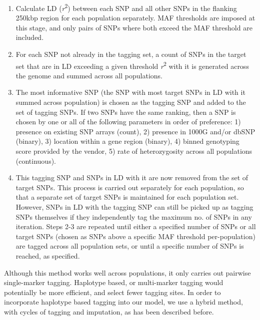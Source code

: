\begin{enumerate}
\item Calculate \gls{LD} (\textit{r}\textsuperscript{2}) between each \gls{SNP} and all other \glspl{SNP} in the flanking 250kbp region for each population separately. \gls{MAF} thresholds are imposed at this stage, and only pairs of \glspl{SNP} where both exceed the \gls{MAF} threshold are included.
\item For each \gls{SNP} not already in the tagging set, a count of \glspl{SNP} in the target set that are in \gls{LD} exceeding a given threshold \textit{r}\textsuperscript{2} with it is generated across the genome and summed across all populations.
\item The most informative \gls{SNP} (the \gls{SNP} with most target \glspl{SNP} in \gls{LD} with it summed across population) is chosen as the tagging \gls{SNP} and added to the set of tagging \glspl{SNP}. If two \glspl{SNP} have the same ranking, then a \gls{SNP} is chosen by one or all of the following parameters in order of preference: 1) presence on existing SNP arrays (count), 2) presence in 1000G and/or \gls{dbSNP} (binary), 3) location within a gene region (binary), 4) binned genotyping score provided by the vendor, 5) rate of heterozygosity across all populations (continuous).
\item This tagging SNP and SNPs in LD with it are now removed from the set of target SNPs. This process is carried out separately for each population, so that a separate set of target SNPs is maintained for each population set. However, SNPs in LD with the tagging SNP can still be picked up as tagging SNPs themselves if they independently tag the maximum no. of SNPs in any iteration.
Steps 2-3 are repeated until either a specified number of SNPs or all target SNPs (chosen as SNPs above a specific MAF threshold per-population) are tagged across all population sets, or until a specific number of SNPs is reached, as specified.
\end{enumerate}

Although this method works well across populations, it only carries out pairwise single-marker tagging. Haplotype based, or multi-marker tagging would potentially be more efficient, and select fewer tagging sites. In order to incorporate haplotype based tagging into our model, we use a hybrid method, with cycles of tagging and imputation, as has been described before.\cite{Hoffmann2011422}

